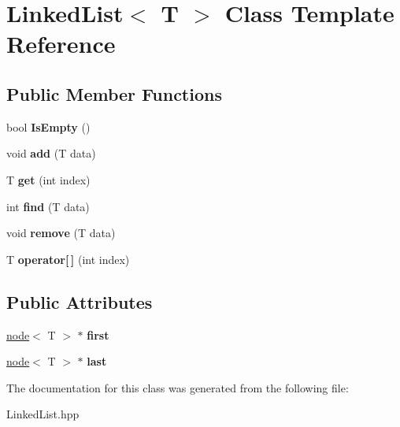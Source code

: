 \hypertarget{classLinkedList}{}\section{Linked\+List$<$ T $>$ Class Template Reference}
\label{classLinkedList}
\subsection*{Public Member Functions}
\begin{DoxyCompactItemize}
\item 
\mbox{\label{classLinkedList_ac5a0d903d22d1157e98b6d3c182e1c74}} 
bool {\bfseries Is\+Empty} ()
\item 
\mbox{\label{classLinkedList_aad1e9d6d7611d4f0bfde0e90da2c108b}} 
void {\bfseries add} (T data)
\item 
\mbox{\label{classLinkedList_a25079ed9b408efad63a1522c818d8705}} 
T {\bfseries get} (int index)
\item 
\mbox{\label{classLinkedList_a35d443ed5be16bab9051c648e6e36d5e}} 
int {\bfseries find} (T data)
\item 
\mbox{\label{classLinkedList_ab9aa6e03f271785f6b488d8c4cc3f3c7}} 
void {\bfseries remove} (T data)
\item 
\mbox{\label{classLinkedList_a066a9a70c15be13a120b38305560135c}} 
T {\bfseries operator\mbox{[}$\,$\mbox{]}} (int index)
\end{DoxyCompactItemize}
\subsection*{Public Attributes}
\begin{DoxyCompactItemize}
\item 
\mbox{\label{classLinkedList_acaeb0499689a66aa0f0c6f71864da9a2}} 
\hyperlink{structnode}{node}$<$ T $>$ $\ast$ {\bfseries first}
\item 
\mbox{\label{classLinkedList_ab584a6000168e8e43549dffda60240b2}} 
\hyperlink{structnode}{node}$<$ T $>$ $\ast$ {\bfseries last}
\end{DoxyCompactItemize}


The documentation for this class was generated from the following file\+:\begin{DoxyCompactItemize}
\item 
Linked\+List.\+hpp\end{DoxyCompactItemize}
